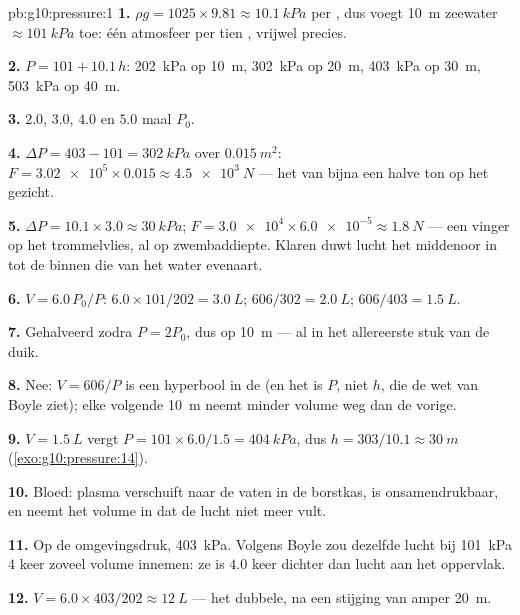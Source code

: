 \begin{solution}{pb:g10:pressure:1}
\textbf{1.} $\rho g = 1025 \times 9.81 \approx \qty{10.1}{kPa}$ per
, dus voegt \qty{10}{m} zeewater $\approx \qty{101}{kPa}$ toe: één
atmosfeer per tien , vrijwel precies.

\textbf{2.} $P = 101 + 10.1\,h$: \qty{202}{kPa} op \qty{10}{m},
\qty{302}{kPa} op \qty{20}{m}, \qty{403}{kPa} op \qty{30}{m},
\qty{503}{kPa} op \qty{40}{m}.

\textbf{3.} $2.0$, $3.0$, $4.0$ en $5.0$ maal $P_0$.

\textbf{4.} $\Delta P = 403 - 101 = \qty{302}{kPa}$ over
$\qty{0.015}{m^2}$: $F = \num{3.02e5} \times 0.015 \approx
\qty{4.5e3}{N}$ --- het  van bijna een halve ton op het gezicht.

\textbf{5.} $\Delta P = 10.1 \times 3.0 \approx \qty{30}{kPa}$;
$F = \num{3.0e4} \times \num{6.0e-5} \approx \qty{1.8}{N}$ --- een
vinger op het trommelvlies, al op zwembaddiepte. Klaren duwt lucht het
middenoor in tot de  binnen die van het water evenaart.

\textbf{6.} $V = 6.0 \, P_0/P$: $6.0 \times 101/202 = \qty{3.0}{L}$;
$606/302 = \qty{2.0}{L}$; $606/403 = \qty{1.5}{L}$.

\textbf{7.} Gehalveerd zodra $P = 2P_0$, dus op \qty{10}{m} --- al in
het allereerste stuk van de duik.

\textbf{8.} Nee: $V = 606/P$ is een hyperbool in de  (en
het is $P$, niet $h$, die de wet van Boyle ziet); elke volgende
\qty{10}{m} neemt minder volume weg dan de vorige.

\textbf{9.} $V = \qty{1.5}{L}$ vergt
$P = 101 \times 6.0/1.5 = \qty{404}{kPa}$, dus
$h = 303/10.1 \approx \qty{30}{m}$ (\cref{exo:g10:pressure:14}).

\textbf{10.} Bloed: plasma verschuift naar de vaten in de borstkas, is
onsamendrukbaar, en neemt het volume in dat de lucht niet meer vult.

\textbf{11.} Op de omgevingsdruk, \qty{403}{kPa}. Volgens Boyle zou
dezelfde lucht bij \qty{101}{kPa} $4$ keer zoveel volume innemen: ze is
$4.0$ keer dichter dan lucht aan het oppervlak.

\textbf{12.} $V = 6.0 \times 403/202 \approx \qty{12}{L}$ --- het
dubbele, na een stijging van amper \qty{20}{m}.


\end{solution}
